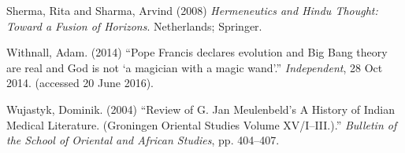 \begin{thebibliography}{99}
Sherma, Rita and Sharma, Arvind (2008) {\sl Hermeneutics and Hindu Thought: Toward a Fusion of Horizons}. Netherlands; Springer.

Withnall, Adam. (2014) ``Pope Francis declares evolution and Big Bang theory are real and God is not `a magician with a magic wand'.'' {\sl Independent}, 28 Oct 2014. (accessed 20 June 2016).

Wujastyk, Dominik. (2004) ``Review of G. Jan Meulenbeld's A History of Indian Medical Literature. (Groningen Oriental Studies Volume XV/I--III.).'' {\sl Bulletin of the School of Oriental and African Studies}, pp. 404--407.
\end{thebibliography}

\theendnotes
